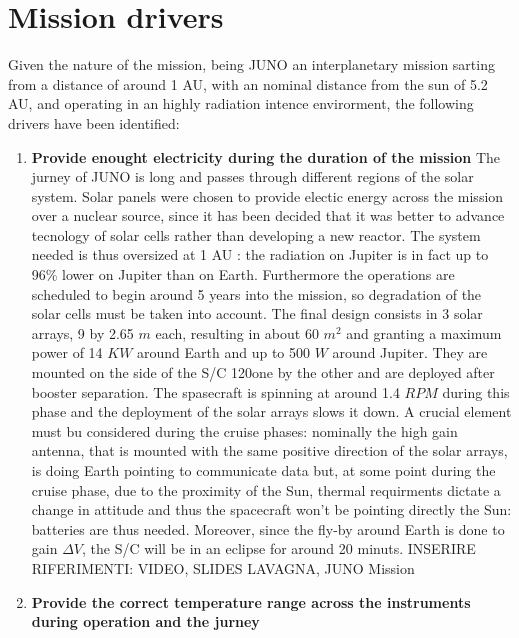 \section{Mission drivers}
\label{sec:drivers}

Given the nature of the mission, being JUNO an interplanetary mission sarting from a distance of around 1 AU, with an nominal distance from the sun of 5.2 AU, and operating in an highly radiation 
intence envirorment, the following drivers have been identified: 

\begin{enumerate}[leftmargin=1.5em]
    \item \textbf{Provide enought electricity during the duration of the mission} 
    \newline The jurney of JUNO is long and passes through different regions of the solar system. Solar panels were chosen to provide electic energy across the mission over a nuclear source, since it has been decided that it was better to advance tecnology of solar cells rather than developing a new reactor. The system needed is thus oversized at 1 AU %
    : the radiation on Jupiter is in fact up to 96\% lower on Jupiter than on Earth. Furthermore the operations are scheduled to begin around 5 years into the mission, so degradation of the solar cells must be taken into account. The final design consists in 3 solar arrays, 9 by 2.65 $m$ each, resulting in about 60 $m^2$ and granting a maximum power of 14 $KW$ around Earth and up to 500 $W$ around Jupiter. They are mounted on the side of the S/C 120\textdegree one by the other and are deployed after booster separation. The spasecraft is spinning at around 1.4 $RPM$ during this phase and the deployment of the solar arrays slows it down. A crucial element must bu considered during the cruise phases: nominally the high gain antenna, that is mounted with the same positive direction of the solar arrays, is doing Earth pointing to communicate data but, at some point during the cruise phase, due to the proximity of the Sun, thermal requirments dictate a change in attitude and thus the spacecraft won't be pointing directly the Sun: batteries are thus needed. Moreover, since the fly-by around Earth is done to gain $\Delta V$, the S/C will be in an eclipse for around 20 minuts.                INSERIRE RIFERIMENTI: VIDEO, SLIDES LAVAGNA, JUNO Mission
    \item \textbf{Provide the correct temperature range across the instruments during operation and the jurney}

\end{enumerate}
